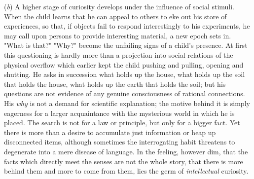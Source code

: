 \documentclass[letterpaper]{book}
\begin{document}
(\emph{b}) A higher stage of curiosity develops under the influence of
social stimuli. When the child learns that he can appeal to others to
eke out his store of experiences, so that, if objects fail to respond
interestingly to his experiments, he may call upon persons to provide
interesting material, a new epoch sets in. "What is that?" "Why?" become
the unfailing signs of a child's presence. At first this questioning is
hardly more than a projection into social relations of the physical
overflow which earlier kept the child pushing and pulling, opening and
shutting. He asks in succession what holds up the house, what holds up
the soil that holds the house, what holds up the earth that holds the
soil; but his questions are not evidence of any genuine consciousness of
rational connections. His \emph{why} is not a demand for scientific
explanation; the motive behind it is simply eagerness for a larger
acquaintance with the mysterious world in which he is placed. The search
is not for a law or principle, but only for a bigger fact. Yet there is
more than a desire to accumulate just information or heap up
disconnected items, although sometimes the interrogating habit threatens
to degenerate into a mere disease of language. In the feeling, however
dim, that the facts which directly meet the senses are not the whole
story, that there is more behind them and more to come from them, lies
the germ of \emph{intellectual} curiosity.

\end{document}
